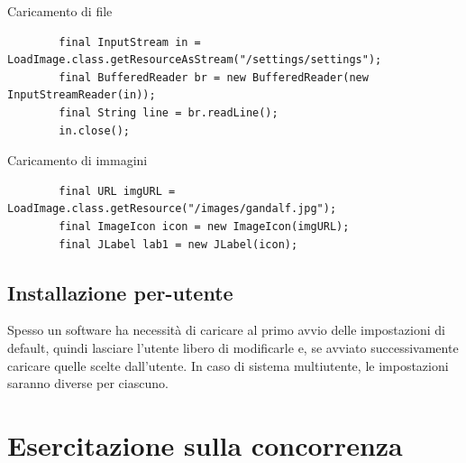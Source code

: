 \documentclass[presentation]{beamer}
\begin{document}
\begin{frame}[fragile]{Caricamento di file}
	\begin{lstlisting}
		final InputStream in = LoadImage.class.getResourceAsStream("/settings/settings");
		final BufferedReader br = new BufferedReader(new InputStreamReader(in));
		final String line = br.readLine();
		in.close();
\end{lstlisting}
\end{frame}

\begin{frame}[fragile]{Caricamento di immagini}
	\begin{lstlisting}
		final URL imgURL = LoadImage.class.getResource("/images/gandalf.jpg");
		final ImageIcon icon = new ImageIcon(imgURL);
		final JLabel lab1 = new JLabel(icon);
	\end{lstlisting}
\end{frame}

\subsection{Installazione per-utente}

 {
	 {
		Spesso un software ha necessità di caricare al primo avvio delle impostazioni di default, quindi lasciare l'utente libero di modificarle e, se avviato successivamente caricare quelle scelte dall'utente. In caso di sistema multiutente, le impostazioni saranno diverse per ciascuno.
	}
	 {
		\footnotesize
	}
}

\section{Esercitazione sulla concorrenza}
\end{document}
